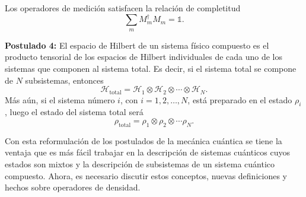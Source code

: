 Los operadores de medición satisfacen la relación de completitud \begin{equation}\label{completitud3postulate}
	  	\sum_m M_m^\dagger M_m=\mathds{1}.
\end{equation}

\textbf{Postulado 4:} El espacio de Hilbert de un sistema físico compuesto es el producto tensorial de los espacios de Hilbert individuales de cada uno de los sistemas que componen al sistema total. Es decir, si el sistema total se compone de $N$ subsistemas, entonces \begin{equation}\label{Htotal4postulado}
	\mathcal{H}_{\text{total}}=\mathcal{H}_1\otimes \mathcal{H}_2\otimes \cdots \otimes \mathcal{H}_N.
\end{equation}
 Más aún, si el sistema número $i$, con $i=1,2,\ldots,N$, está preparado en el
estado $\rho_i$, luego  el estado del sistema total será
\begin{equation}\label{rhototal4postulado}
	\rho_{\text{total}}=\rho_1\otimes \rho_2 \otimes \cdots \rho_N.
\end{equation}


\setlength{\leftskip}{0pt}

Con esta reformulación de los postulados de la mecánica cuántica se tiene la
ventaja que es más fácil trabajar en la descripción de sistemas cuánticos cuyos estados son mixtos y la descripción de subsistemas de un sistema cuántico compuesto. Ahora, es necesario discutir estos conceptos, nuevas definiciones y hechos sobre operadores de densidad. 

